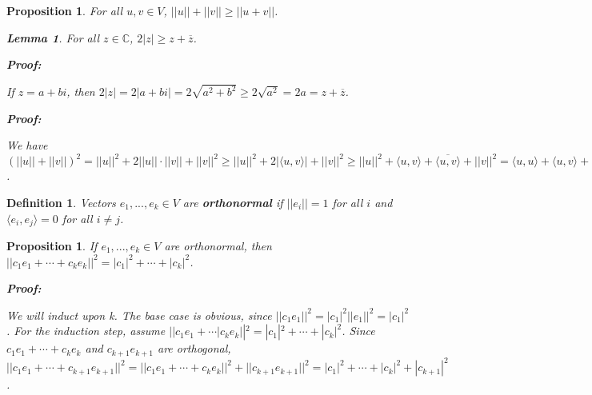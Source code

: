 \documentclass{article}
\theoremstyle{colontheorem}
\newtheorem{proposition}[theorem]{Proposition}
\newtheorem{definition}[theorem]{Definition}
\newtheorem{lemma}{Lemma}[theorem]
\newenvironment{Proposition}
{
	\begin{mdframed}[backgroundcolor=TheoremOrange!10]
	\begin{proposition}
}
{
	\end{proposition}
	\end{mdframed}
	
	\vspace{.15in}
}
\newenvironment{Def}
{
	\begin{mdframed}[backgroundcolor=DefGreen!10]
	\begin{definition}
}
{
	\end{definition}
	\end{mdframed}
	
	\vspace{.15in}
}
\newenvironment{Lemma}
{
	\begin{mdframed}[backgroundcolor=LemmaYellow!10]
	\begin{lemma}
}
{
	\end{lemma}
	\end{mdframed}
	
	\vspace{.03in}
}
\newenvironment{Proof}
{
	\begin{mdframed}[backgroundcolor=ProofPurple!10]
	\textbf{Proof:}%
}
{
	\end{mdframed}
	
	\vspace{.085in}
}
\begin{document}
\begin{Proposition}
	
	For all $u, v \in V$, $||u|| + ||v|| \geq ||u + v||$.
	
	\begin{Lemma}
		
		For all $z \in \mathbb{C}$, $2|z| \geq z + \overline{z}$.
		
		\begin{Proof}
			If $z = a+bi$, then $2|z| = 2|a+bi| = 2\sqrt{a^2 + b^2} \geq 2\sqrt{a^2} = 2a = z + \overline{z}$.
			
		\end{Proof}
		
	\end{Lemma}
	
	\begin{Proof}
		We have $\left( ||u|| + ||v|| \right)^2 = ||u||^2 + 2||u|| \cdot ||v|| + ||v||^2 \geq ||u||^2 + 2 | \langle u, v \rangle | + ||v||^2 \geq ||u||^2 + \langle u, v \rangle + \overline{\langle u, v \rangle} + ||v||^2 = \langle u, u \rangle + \langle u, v \rangle + \langle v, u \rangle + \langle v, v \rangle = \langle u + v, u + v \rangle = ||u + v||^2$.
		
	\end{Proof}

\end{Proposition}



\begin{Def}
	
	Vectors $e_1, ..., e_k \in V$ are \textbf{orthonormal} if $||e_i|| = 1$ for all $i$ and $\langle e_i, e_j \rangle = 0$ for all $i \neq j$.
	
\end{Def}



\begin{Proposition}
	
	If $e_1, ..., e_k \in V$ are orthonormal, then $||c_1 e_1 + \cdots + c_k e_k||^2 = |c_1|^2 + \cdots + |c_k|^2$.
	
	\begin{Proof}
		We will induct upon k. The base case is obvious, since $||c_1 e_1||^2 = |c_1|^2 ||e_1||^2 = |c_1|^2$. For the induction step, assume $||c_1 e_1 + \cdots | c_k e_k||^2 = |c_1|^2 + \cdots + |c_k|^2$. Since $c_1 e_1 + \cdots + c_k e_k$ and $c_{k+1} e_{k+1}$ are orthogonal, $||c_1 e_1 + \cdots + c_{k+1} e_{k+1}||^2 = ||c_1 e_1 + \cdots + c_k e_k||^2 + ||c_{k+1} e_{k+1}||^2 = |c_1|^2 + \cdots + |c_k|^2 + |c_{k+1}|^2$.
		
	\end{Proof}
	
\end{Proposition}
\end{document}
